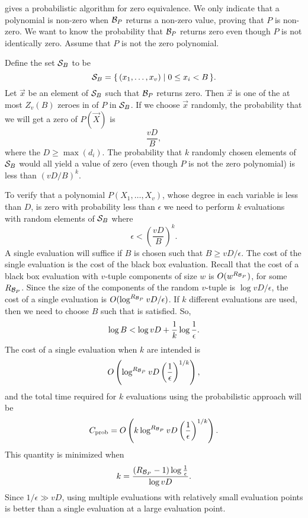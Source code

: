 \medskip
{} gives a probabilistic algorithm for zero
equivalence.  We only indicate that a polynomial is non-zero when
${\cal B}_P$ returns a non-zero value, proving that $P$ is non-zero.
We want to know the probability that ${\cal B}_P$ returns zero even
though $P$ is not identically zero.  Assume that $P$ is not the zero
polynomial.

Define the set ${\cal S}_B$ to be
\[
{\cal S}_B = \{\,(x_1, \ldots, x_v) \mid 0 \le x_i < B\,\}.
\] 
Let $\vec{x}$ be an element of ${\cal S}_B$ such that ${\cal B}_P$
returns zero.  Then $\vec{x}$ is one of the at most $Z_v(B)$ zeroes in
of $P$ in ${\cal S}_B$.  If we choose $\vec{x}$ randomly, the
probability that we will get a zero of $P(\vec{X})$ is 
\[
\frac{vD}{B},
\]
where the $D \ge \max(d_i)$.  The probability that $k$ randomly chosen
elements of ${\cal S}_B$ would all yield a value of zero (even though
$P$ is not the zero polynomial) is less than $(vD/B)^k$.

To verify that a polynomial $P(X_1, \ldots, X_v)$, whose degree in
each variable is less than $D$, is zero with probability less than
$\epsilon$ we need to perform $k$ evaluations with random elements of
${\cal S}_B$ where
\begin{equation}
\epsilon < \left(\frac{v D }{B}\right)^k. 
\label{Bound:Eq}
\end{equation}
A single evaluation will suffice if $B$ is chosen such that $B \ge
vD/\epsilon$.  The cost of the single evaluation is the cost of the
black box evaluation.  Recall that the cost of a black box evaluation
with $v$-tuple components of size $w$ is $O(w^{R_{{\cal B}_P}})$, for some
$R_{{\cal B}_P}$.  Since the size of the components of the random $v$-tuple is
$\log vD/\epsilon$, the cost of a single evaluation is
$O(\log^{R_{{\cal B}_P}} v D/\epsilon)$.  If $k$ different evaluations are
used, then we need to choose $B$ such that  is
satisfied.  So,
\[
\log B < \log vD + {1 \over k} \log \frac{1}{\epsilon}.
\]
The cost of a single evaluation when $k$ are intended is
\[
O\left(\log^{R_{{\cal B}_P}} {vD \left({1 \over \epsilon}\right)^{1/k}}\right),
\]
and the total time required for $k$ evaluations using the
probabilistic approach will be 
\[
C_{\rm prob} 
   = O\left(k \log^{R_{{\cal B}_P}} {vD \left({1 \over \epsilon}\right)^{1/k}}\right).
\]
This quantity is minimized when
\begin{equation}\label{Zero:PCount:Eq}
k = {({R_{{\cal B}_P}} - 1) \log{1 \over \epsilon} \over \log vD}.
\end{equation}
Since $1/\epsilon \gg vD$, using multiple evaluations with relatively
small evaluation points is better than a single evaluation at a
large evaluation point. 

